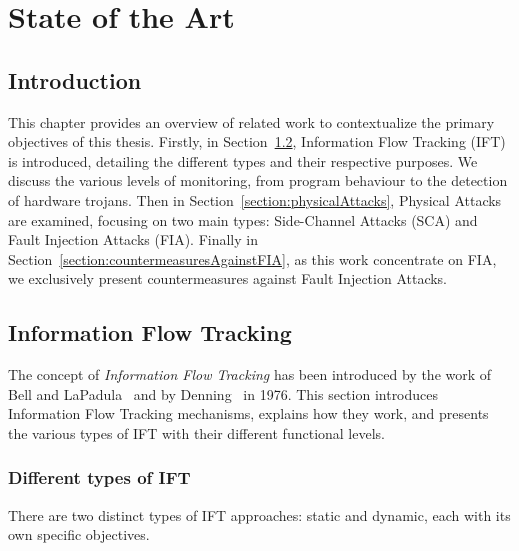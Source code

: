\chapter{State of the Art}
\label{chapter:soa}
\minitoc

\section{Introduction}
This chapter provides an overview of related work to contextualize the primary objectives of this thesis. Firstly, in Section~\ref{section:ift}, Information Flow Tracking (IFT) is introduced, detailing the different types and their respective purposes. We discuss the various levels of monitoring, from program behaviour to the detection of hardware trojans.
Then in Section~\ref{section:physicalAttacks}, Physical Attacks are examined, focusing on two main types: Side-Channel Attacks (SCA) and Fault Injection Attacks (FIA).
Finally in Section~\ref{section:countermeasuresAgainstFIA}, as this work concentrate on FIA, we exclusively present countermeasures against Fault Injection Attacks.

\section{Information Flow Tracking}
\label{section:ift}
The concept of \textit{Information Flow Tracking} has been introduced by the work of Bell and LaPadula~\cite{BLP-76-military} and by Denning~\cite{D-76-commacm} in 1976.
This section introduces Information Flow Tracking mechanisms, explains how they work, and presents the various types of IFT with their different functional levels.
    
\subsection{Different types of IFT}
There are two distinct types of IFT approaches: static and dynamic, each with its own specific objectives.

